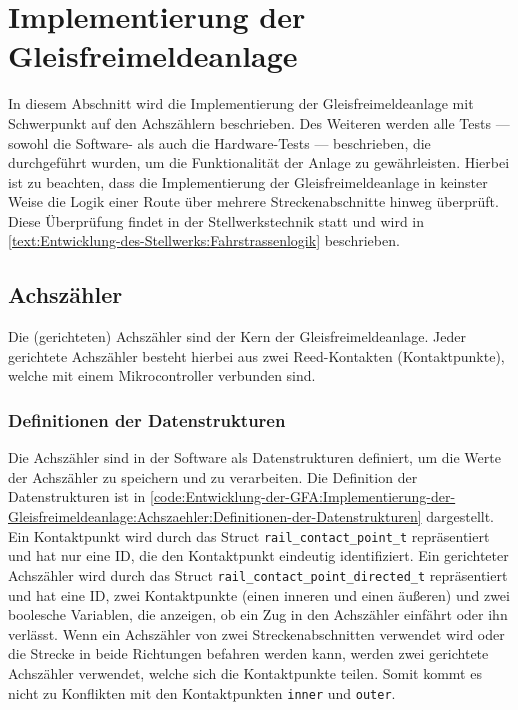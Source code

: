 \section{Implementierung der Gleisfreimeldeanlage}\label{text:Entwicklung-der-GFA:Implementierung-der-Gleisfreimeldeanlage}

In diesem Abschnitt wird die Implementierung der Gleisfreimeldeanlage mit Schwerpunkt auf den Achszählern beschrieben. Des Weiteren werden alle Tests --- sowohl die Software- als auch die Hardware-Tests --- beschrieben, die durchgeführt wurden, um die Funktionalität der Anlage zu gewährleisten. Hierbei ist zu beachten, dass die Implementierung der Gleisfreimeldeanlage in keinster Weise die Logik einer Route über mehrere Streckenabschnitte hinweg überprüft. Diese Überprüfung findet in der Stellwerkstechnik statt und wird in \autoref{text:Entwicklung-des-Stellwerks:Fahrstrassenlogik}  beschrieben.

\subsection{Achszähler}\label{text:Entwicklung-der-GFA:Implementierung-der-Gleisfreimeldeanlage:Achszähler}

Die (gerichteten) Achszähler sind der Kern der Gleisfreimeldeanlage. Jeder gerichtete Achszähler besteht hierbei aus zwei Reed-Kontakten (Kontaktpunkte), welche mit einem Mikrocontroller verbunden sind.

\subsubsection{Definitionen der Datenstrukturen}\label{text:Entwicklung-der-GFA:Implementierung-der-Gleisfreimeldeanlage:Achszähler:Definitionen-der-Datenstrukturen}

Die Achszähler sind in der Software als Datenstrukturen definiert, um die Werte der Achszähler zu speichern und zu verarbeiten. Die Definition der Datenstrukturen ist in \autoref{code:Entwicklung-der-GFA:Implementierung-der-Gleisfreimeldeanlage:Achszaehler:Definitionen-der-Datenstrukturen} dargestellt. Ein Kontaktpunkt wird durch das Struct \texttt{rail\_contact\_point\_t} repräsentiert und hat nur eine ID, die den Kontaktpunkt eindeutig identifiziert. Ein gerichteter Achszähler wird durch das Struct \texttt{rail\_contact\_point\_directed\_t} repräsentiert und hat eine ID, zwei Kontaktpunkte (einen inneren und einen äußeren) und zwei boolesche Variablen, die anzeigen, ob ein Zug in den Achszähler einfährt oder ihn verlässt.
\newline
Wenn ein Achszähler von zwei Streckenabschnitten verwendet wird oder die Strecke in beide Richtungen befahren werden kann, werden zwei gerichtete Achszähler verwendet, welche sich die Kontaktpunkte teilen. Somit kommt es nicht zu Konflikten mit den Kontaktpunkten \texttt{inner} und \texttt{outer}.

